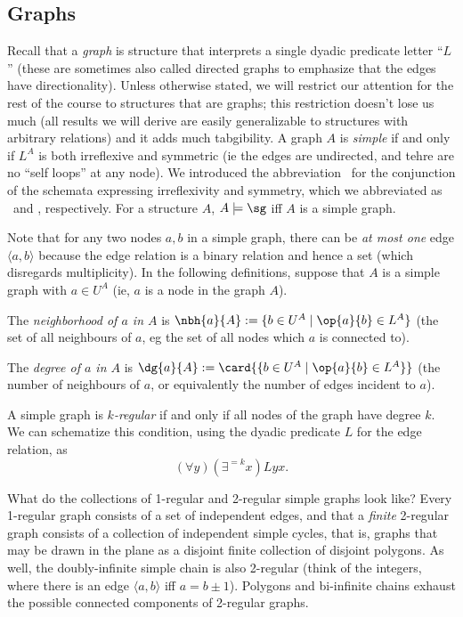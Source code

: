 \subsection{Graphs}
Recall that a \emph{graph} is structure that interprets a single dyadic predicate letter ``$L$'' (these are sometimes also called directed graphs to emphasize that the edges have directionality). Unless otherwise stated, we will restrict our attention for the rest of the course to structures that are graphs; this restriction doesn't lose us much (all results we will derive are easily generalizable to structures with arbitrary relations) and it adds much tabgibility. A graph $A$ is \emph{simple} if and only if $L^A$ is both irreflexive and symmetric (ie the edges are undirected, and tehre are no ``self loops'' at any node). We introduced the abbreviation \sg\ for the conjunction of the schemata expressing irreflexivity and symmetry, which we abbreviated as \irr\ and \sym, respectively. For a structure $A$, $A \models \sg$ iff $A$ is a simple graph. 

Note that for any two nodes $a, b$ in a simple graph, there can be \emph{at most one} edge $\langle a, b \rangle$ because the edge relation is a binary relation and hence a set (which disregards multiplicity). In the following definitions, suppose that $A$ is a simple graph with $a \in U^A$ (ie, $a$ is a node in the graph $A$). 

\begin{definition}
The \emph{neighborhood of $a$ in $A$} is $\nbh{a}{A} := \{b\in U^A\mid \op{a}{b}\in L^A\}$ (the set of all neighbours of $a$, eg the set of all nodes which $a$ is connected to). 
\end{definition}

\begin{definition}
The \emph{degree of $a$ in $A$} is $\dg{a}{A} := \card{\{b\in U^A\mid \op{a}{b}\in L^A\}}$ (the number of neighbours of $a$, or equivalently the number of edges incident to $a$).
\end{definition}


\begin{definition}
A simple graph is \emph{$k$-regular} if and only if all nodes of the graph have degree $k$. We can schematize this condition, using the dyadic predicate $L$ for the edge relation, as
\[(\forall y)(\exists^{=k}x)Lyx.\]
\end{definition}

What do the collections of 1-regular and 2-regular simple graphs look like? Every 1-regular graph consists of a set of independent edges, and that a \emph{finite} 2-regular graph consists of a collection of independent simple cycles, that is, graphs that may be drawn in the plane as a disjoint finite collection of disjoint polygons. As well, the doubly-infinite simple chain is also 2-regular (think of the integers, where there is an edge $\langle a, b \rangle$ iff $a = b \pm 1$). Polygons and bi-infinite chains exhaust the possible connected components of 2-regular graphs.

